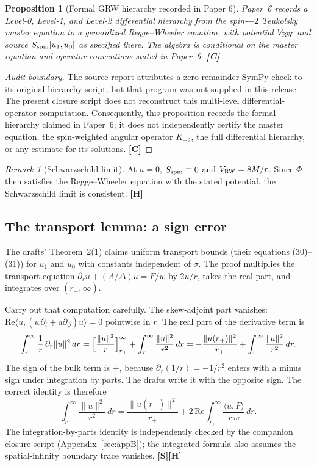 \documentclass[11pt,a4paper]{article}
\newcommand{\VS}{\textcolor{vs}{\textbf{[S]}}}
\newcommand{\VH}{\textcolor{vh}{\textbf{[H]}}}
\newcommand{\CC}{\textcolor{cc}{\textbf{[C]}}}
\newtheorem{proposition}[theorem]{Proposition}
\theoremstyle{remark}
\newtheorem{remark}[theorem]{Remark}
\theoremstyle{definition}
\begin{document}
\begin{proposition}[Formal GRW hierarchy recorded in Paper 6]
\label{prop:grw}
Paper~6 records a Level-0, Level-1, and Level-2 differential hierarchy from the spin-$-2$ Teukolsky master equation to a generalized Regge--Wheeler equation, with potential $V_{\rm RW}$ and source $S_{\rm spin}[u_1,u_0]$ as specified there. The algebra is conditional on the master equation and operator conventions stated in Paper~6. \CC
\end{proposition}

\begin{proof}[Audit boundary]
The source report attributes a zero-remainder SymPy check to its original hierarchy script, but that program was not supplied in this release. The present closure script does not reconstruct this multi-level differential-operator computation. Consequently, this proposition records the formal hierarchy claimed in Paper~6; it does not independently certify the master equation, the spin-weighted angular operator $K_{-2}$, the full differential hierarchy, or any estimate for its solutions. \CC
\end{proof}

\begin{remark}[Schwarzschild limit]
At $a=0$, $S_{\rm spin}\equiv 0$ and $V_{\rm RW} = 8M/r$. Since $\Phi$ then satisfies the Regge--Wheeler equation with the stated potential, the Schwarzschild limit is consistent. \VH
\end{remark}

\subsection{The transport lemma: a sign error}

The drafts' Theorem~2(1) claims uniform transport bounds (their equations (30)--(31)) for $u_1$ and $u_0$ with constants independent of $\sigma$. The proof multiplies the transport equation $\partial_r u + (A/\Delta)u = F/w$ by $2u/r$, takes the real part, and integrates over $(r_+,\infty)$.

Carry out that computation carefully. The skew-adjoint part vanishes: $\mathrm{Re}\langle u, (w\partial_t + a\partial_\phi)u\rangle = 0$ pointwise in $r$. The real part of the derivative term is
\[
\int_{r_+}^\infty \frac{1}{r}\,\partial_r\|u\|^2\,dr = \Bigl[\frac{\|u\|^2}{r}\Bigr]_{r_+}^\infty + \int_{r_+}^\infty\frac{\|u\|^2}{r^2}\,dr = -\frac{\|u(r_+)\|^2}{r_+} + \int_{r_+}^\infty \frac{\|u\|^2}{r^2}\,dr.
\]
The sign of the bulk term is $+$, because $\partial_r(1/r) = -1/r^2$ enters with a minus sign under integration by parts. The drafts write it with the opposite sign. The correct identity is therefore
\begin{equation}
\int_{r_+}^\infty \frac{\|u\|^2}{r^2}\,dr = \frac{\|u(r_+)\|^2}{r_+} + 2\,\mathrm{Re}\int_{r_+}^\infty \frac{\langle u,F\rangle}{r\,w}\,dr. \label{eq:transport}
\end{equation}
The integration-by-parts identity is independently checked by the companion closure script (Appendix~\ref{sec:appB}); the integrated formula also assumes the spatial-infinity boundary trace vanishes. \VS\VH
\end{document}
